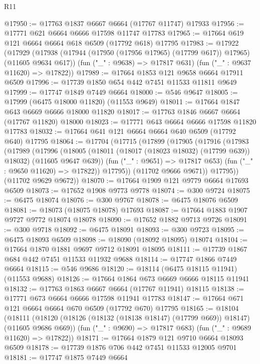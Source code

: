 \begin{lexlean}{R11}
\begin{coremodule}
@17950 := @17763 @1837 @6667 @6664 (@17767 @11747) @17933
@17956 := @17771 @621 @6664 @6666 @17598 @11747 @17783
@17965 := @17664 @619 @121 @6664 @6664 @618 @6509 (@17792 @618) @17795
@17983 := @17922
    (@17929
      (@17938 (@17944 (@17950 (@17956 @17965) (@17799 @617)) @17965) (@11605 @9634 @617))
      (fun ("_" : @9638) => @17817 @631)
      (fun ("_" : @9637 @11620) => @17822))
@17989 := @17664 @1853 @121 @9658 @6664 @17911 @6509
@17996 := @17739 @1850 @654 @442 @7451 @11533 @11811 @9649
@17999 := @17747 @1849 @7449 @6664
@18000 := @546 @9647
@18005 := @17999 (@6475 @18000 @11820) (@11553 @9649)
@18011 := @17664 @1847 @643 @6669 @6666 @18000 @11820
@18017 := @17763 @1846 @6667 @6664 (@17767 @11820) @18000
@18023 := @17771 @643 @6664 @6666 @17598 @11820 @17783
@18032 := @17664 @641 @121 @6664 @6664 @640 @6509 (@17792 @640) @17795
@18064 := @17704
    (@17715
      (@17899
        (@17905
          (@17916
            (@17983
              (@17989
                (@17996
                  (@18005
                    (@18011 (@18017 (@18023 @18032) (@17799 @639)) @18032)
                    (@11605 @9647 @639))
                  (fun ("_" : @9651) => @17817 @653)
                  (fun ("_" : @9650 @11620) => @17822))
                @17795))
            (@11702 @9666 @9671))
          @17795))
      (@11702 @9629 @9672))
@18070 := @17664 @1909 @121 @9779 @6664 @17693 @6509
@18073 := @17652 @1908 @9773 @9778
@18074 := @300 @9724
@18075 := @6475 @18074
@18076 := @300 @9767
@18078 := @6475 @18076 @6509
@18081 := @18073 (@18075 @18078) @17693
@18087 := @17664 @1883 @1907 @9727 @9772 @18074 @18078
@18090 := @17652 @1882 @9713 @9726
@18091 := @300 @9718
@18092 := @6475 @18091
@18093 := @300 @9723
@18095 := @6475 @18093 @6509
@18098 := @18090 (@18092 @18095) @18074
@18104 := @17664 @1870 @1881 @9697 @9712 @18091 @18095
@18111 := @17739 @1867 @684 @442 @7451 @11533 @11932 @9688
@18114 := @17747 @1866 @7449 @6664
@18115 := @546 @9686
@18120 := @18114 (@6475 @18115 @11941) (@11553 @9688)
@18126 := @17664 @1864 @673 @6669 @6666 @18115 @11941
@18132 := @17763 @1863 @6667 @6664 (@17767 @11941) @18115
@18138 := @17771 @673 @6664 @6666 @17598 @11941 @17783
@18147 := @17664 @671 @121 @6664 @6664 @670 @6509 (@17792 @670) @17795
@18165 := @18104
    (@18111
      (@18120 (@18126 (@18132 (@18138 @18147) (@17799 @669)) @18147) (@11605 @9686 @669))
      (fun ("_" : @9690) => @17817 @683)
      (fun ("_" : @9689 @11620) => @17822))
@18171 := @17664 @1879 @121 @9710 @6664 @18093 @6509
@18178 := @17739 @1876 @706 @442 @7451 @11533 @12005 @9701
@18181 := @17747 @1875 @7449 @6664

\end{coremodule}
\end{lexlean}
